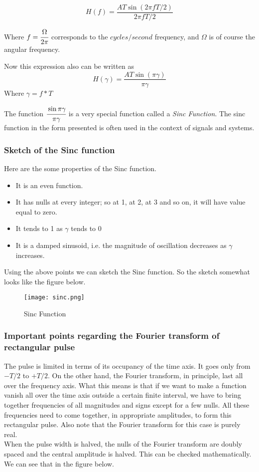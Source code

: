 \begin{equation}
H(f)=\frac{AT \sin({2\pi f T/2})}{2\pi f T/2}
\end{equation}


Where $f = \cfrac{\Omega}{2\pi}$ corresponds to the ${cycles}/{second}$ frequency, and $\Omega$ is of course the angular frequency.

Now this expression also can be written as
\begin{equation}
H(\gamma)=\frac{AT \sin({\pi \gamma})}{\pi \gamma}
\end{equation}
Where $\gamma = f*T $

The function $\cfrac{\sin{\pi \gamma}}{\pi \gamma}$ is a very special function called a \emph{Sinc Function}. The sinc function in the form presented is often used in the context of signals and systems.

\subsubsection{Sketch of the Sinc function}

Here are the some properties of the Sinc function.
\begin{itemize}
\item It is an even function.
\item It has nulls at every integer; so at 1, at 2, at 3 and so on, it will have value equal to zero.
\item It tends to 1 as $\gamma$ tends to 0
\item It is a damped sinusoid, i.e. the magnitude of oscillation decreases as $\gamma$ increases.
\end{itemize}

Using the above points we can sketch the Sinc function. So the sketch somewhat looks like the figure below.

\begin{figure}[htp]
\centering
\texttt{[image: sinc.png]}
\caption{Sinc Function}
\label{sinc}
\end{figure}

\subsubsection{Important points regarding the Fourier transform of rectangular pulse}


The pulse is limited in terms of its occupancy of the time axis. It goes only from  $-T/2$ to $+T/2$. On the other hand, the Fourier transform, in principle, last all over the frequency axis.
What this means is that if we want to make a function vanish all over the time axis outside a certain finite interval, we have to bring together frequencies of all magnitudes and signs except for a few nulls.
All these frequencies need to come together, in appropriate amplitudes, to form this rectangular pulse. Also note that the Fourier transform for this case is purely real. \\
 When the pulse width is halved, the nulls of the Fourier transform are doubly spaced and the central amplitude is halved. This can be checked mathematically. We can see that in the figure below.

